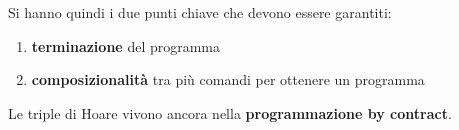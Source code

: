 				      					      			Si hanno quindi i due punti chiave che devono essere garantiti:
				      					      			\begin{enumerate}
				      					      				\item \textbf{terminazione} del programma
				      					      				\item \textbf{composizionalità} tra più comandi per ottenere un programma
				      					      			\end{enumerate}
				      					      			Le triple di Hoare vivono ancora nella \textbf{programmazione by contract}.